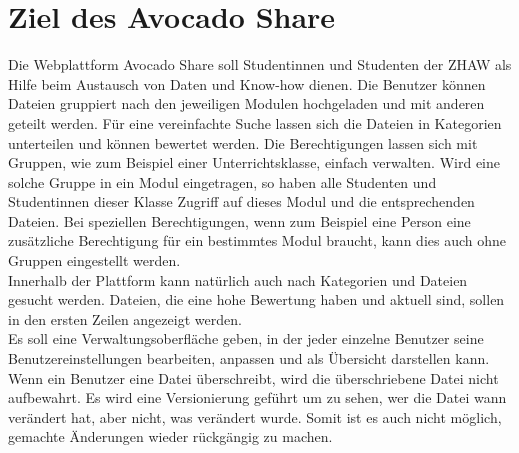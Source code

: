 \section{Ziel des Avocado Share}
Die Webplattform Avocado Share soll Studentinnen und Studenten der ZHAW als Hilfe beim Austausch von Daten und Know-how dienen.
Die Benutzer können Dateien gruppiert nach den jeweiligen Modulen hochgeladen und mit anderen geteilt werden. Für eine vereinfachte Suche lassen sich die Dateien in Kategorien unterteilen und können bewertet werden. Die Berechtigungen lassen sich mit Gruppen, wie zum Beispiel einer Unterrichtsklasse, einfach verwalten. Wird eine solche Gruppe in ein Modul eingetragen, so haben alle Studenten und Studentinnen dieser Klasse Zugriff auf dieses Modul und die entsprechenden Dateien. Bei speziellen Berechtigungen, wenn zum Beispiel eine Person eine zusätzliche Berechtigung für ein bestimmtes Modul braucht, kann dies auch ohne Gruppen eingestellt werden.\\

Innerhalb der Plattform kann natürlich auch nach Kategorien und Dateien gesucht werden. Dateien, die eine hohe Bewertung haben und aktuell sind, sollen in den ersten Zeilen angezeigt werden. \\
Es soll eine Verwaltungsoberfläche geben, in der jeder einzelne Benutzer seine Benutzereinstellungen bearbeiten, anpassen und als Übersicht darstellen kann. \\
Wenn ein Benutzer eine Datei überschreibt, wird die überschriebene Datei nicht aufbewahrt. Es wird eine Versionierung geführt um zu sehen, wer die Datei wann verändert hat, aber nicht, was verändert wurde. Somit ist es auch nicht möglich, gemachte Änderungen wieder rückgängig zu machen.